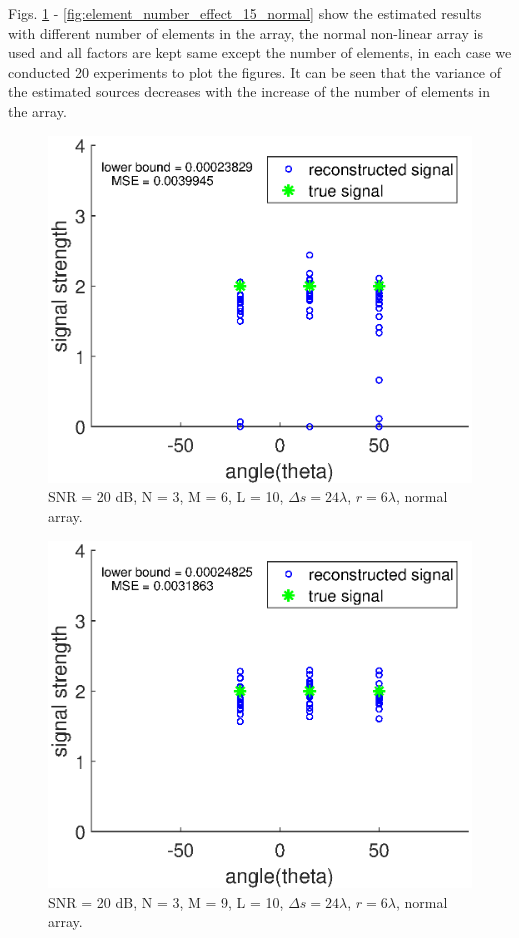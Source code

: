 \documentclass[proposal]{umthesis}          %
\begin{document}
Figs. \ref{fig:element_number_effect_6_normal} - \ref{fig:element_number_effect_15_normal} show the estimated results with different number of elements in the array, the normal non-linear array is used and all factors are kept same except the number of elements, in each case we conducted 20 experiments to plot the figures. It can be seen that the variance of the estimated sources decreases with the increase of the number of elements in the array. 
\begin{figure}[H]
	\centering
	\includegraphics[width=0.6\columnwidth]{./results/element_effect_6_normal}
	\caption{SNR = 20 dB, N = 3, M = 6, L = 10, $\Delta s = 24 \lambda$, $r = 6\lambda$, normal array.}
	\label{fig:element_number_effect_6_normal}
\end{figure}

\begin{figure}[H]
	\centering
	\includegraphics[width=0.6\columnwidth]{./results/element_effect_9_normal}
	\caption{SNR = 20 dB, N = 3, M = 9, L = 10, $\Delta s = 24 \lambda$, $r = 6\lambda$, normal array.}
	\label{fig:element_number_effect_9_normal}
\end{figure}
\end{document}
